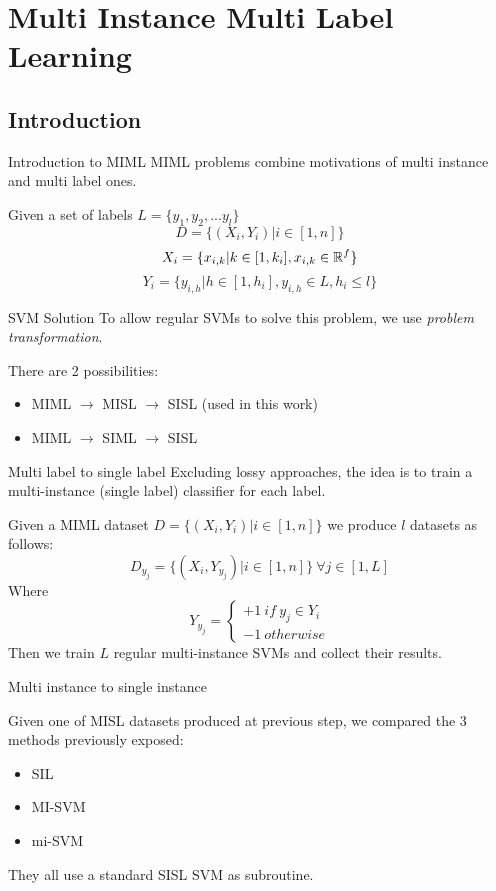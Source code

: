 \section{Multi Instance Multi Label Learning}
 
\subsection{Introduction}
\begin{frame}{Introduction to MIML}
	MIML problems combine motivations of multi instance and multi label ones.
	
	Given a set of labels $L = \{y_1, y_2,... y_l\}$
	$$D = \{(X_i, Y_i) | i \in [1, n]\}$$
	$$X_i = \{x_{i,k} | k \in [1, k_i], x_{i,k} \in \mathbb{R}^f\}$$
	$$Y_i = \{y_{i,h} | h \in [1, h_i], y_{i,h} \in L, h_i \leq l\}$$
\end{frame}

\begin{frame}{SVM Solution}
	To allow regular SVMs to solve this problem, we use \textit{problem transformation}.
	
	There are 2 possibilities:
	\begin{itemize}
		\item MIML $\rightarrow$ MISL $\rightarrow$ SISL (used in this work)
		\item MIML $\rightarrow$ SIML $\rightarrow$ SISL
	\end{itemize}
\end{frame}

\begin{frame}{Multi label to single label}
	Excluding lossy approaches, the idea is to train a multi-instance (single label) classifier for each label.
	
	Given a MIML dataset $D = \{(X_i, Y_i) | i \in [1, n]\}$	we produce $l$ datasets as follows:
	$$D_{y_j} = \{(X_i, Y_{y_j}) | i \in [1, n]\} \ \forall j \in [1, L]$$
	Where
	$$Y_{y_j} = 
	\begin{cases}
		+1 \ if \ y_j \in Y_i \\
		-1 \ otherwise
	\end{cases}$$
	Then we train $L$ regular multi-instance SVMs and collect their results.
\end{frame}

\begin{frame}{Multi instance to single instance}

	Given one of MISL datasets produced at previous step, we compared the 3 methods previously exposed:
	\begin{itemize}
		\item SIL
		\item MI-SVM
		\item mi-SVM
	\end{itemize}
	
	They all use a standard SISL SVM as subroutine.
\end{frame}
